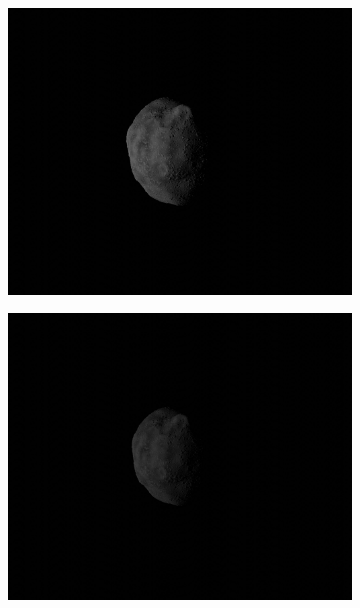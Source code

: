 \begin{figure}[htb]
    \centering
    \begin{subfigure}[b]{0.48\textwidth}
        \centering
        \includegraphics[width=\textwidth]{doc/thesis/0_figures/rendering_lighting/SssbOnly_2017-08-15T115858-281000.jpg}
        \caption{}
        \label{fig:composition_before_1}
    \end{subfigure}
    \begin{subfigure}[b]{0.48\textwidth}
        \centering
        \includegraphics[width=\textwidth]{doc/thesis/0_figures/rendering_lighting/SssbOnly_2017-08-15T115859-288000.jpg}

\end{subfigure}
\end{figure}
